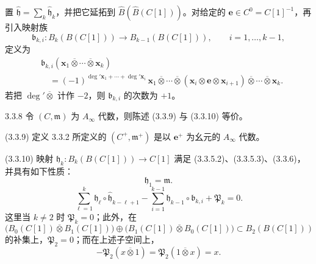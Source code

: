 置 $\widehat{\mathfrak h}=\sum_k\widehat{\mathfrak h}_k$，并把它延拓到
$\widehat B(\widehat B(C[1]))$。对给定的
$\mathbf e\in C^0=C[1]^{-1}$，再引入映射族
\[
  \mathfrak b_{k,i}\colon B_k(B(C[1]))
  \longrightarrow B_{k-1}(B(C[1])),
  \qquad i=1,\ldots,k-1,
\]
定义为
\[
\begin{aligned}
 &\mathfrak b_{k,i}
 (\mathbf x_1\mathbin{\overline\otimes}\cdots
 \mathbin{\overline\otimes}\mathbf x_k)\\
 &\quad={}
 (-1)^{\deg'\mathbf x_1+\cdots+\deg'\mathbf x_i}\,
 \mathbf x_1\mathbin{\overline\otimes}\cdots
 \mathbin{\overline\otimes}
 (\mathbf x_i\otimes\mathbf e\otimes\mathbf x_{i+1})
 \mathbin{\overline\otimes}\cdots
 \mathbin{\overline\otimes}\mathbf x_k .
\end{aligned}
\]
若把 $\deg'\mathbin{\overline\otimes}$ 计作 $-2$，则
$\mathfrak b_{k,i}$ 的次数为 $+1$。

\begin{proposition}{3.3.8}\label{prop:3-3-8}
令 $(C,\mathfrak m)$ 为 $A_\infty$ 代数，则陈述 (3.3.9) 与 (3.3.10) 等价。
\end{proposition}

\par\smallskip\noindent\textup{(3.3.9)}\quad
定义 3.3.2 所定义的 $(C^+,\mathfrak m^+)$ 是以 $\mathbf e^+$ 为幺元的
$A_\infty$ 代数。

\par\smallskip\noindent\textup{(3.3.10)}\quad
映射 $\mathfrak h_k\colon B_k(B(C[1]))\to C[1]$ 满足
(3.3.5.2)、(3.3.5.3)、(3.3.6)，并具有如下性质：
\begin{equation}
  \mathfrak h_1=\mathfrak m.
  \tag{3.3.10.0}\label{eq:3-3-10-0}
\end{equation}
\begin{equation}
  \sum_{\ell=1}^{k}
  \mathfrak h_\ell\circ\widehat{\mathfrak h}_{k-\ell+1}
  -\sum_{i=1}^{k-1}\mathfrak h_{k-1}\circ\mathfrak b_{k,i}
  +\mathfrak P_k=0.
  \tag{3.3.10.1}\label{eq:3-3-10-1}
\end{equation}
这里当 $k\ne2$ 时 $\mathfrak P_k=0$；此外，在
\[
  \bigl(B_0(C[1])\mathbin{\overline\otimes}B_1(C[1])\bigr)
  \oplus
  \bigl(B_1(C[1])\mathbin{\overline\otimes}B_0(C[1])\bigr)
  \subset B_2(B(C[1]))
\]
的补集上，$\mathfrak P_2=0$；而在上述子空间上，
\begin{equation}
  -\mathfrak P_2(x\mathbin{\overline\otimes}1)
  =\mathfrak P_2(1\mathbin{\overline\otimes}x)=x.
  \tag{3.3.10.2}\label{eq:3-3-10-2}
\end{equation}

